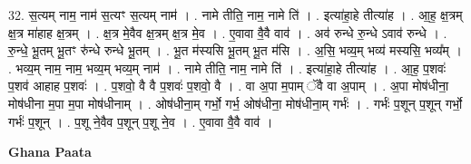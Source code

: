 \documentclass[17pt]{extarticle}
\begin{document}
32. स॒त्यम् नाम॒ नाम॑ स॒त्यꣳ स॒त्यम् नाम॑ । . नामे तीति॒ नाम॒ नामे ति॑ । . इत्या॑हा॒हे तीत्या॑ह । . आ॒ह॒ क्ष॒त्रम् क्ष॒त्र मा॑हाह क्ष॒त्रम् । . क्ष॒त्र मे॒वैव क्ष॒त्रम् क्ष॒त्र मे॒व । . ए॒वावा वै॒वै वाव॑ । . अव॑ रुन्धे रु॒न्धे ऽवाव॑ रुन्धे । . रु॒न्धे॒ भू॒तम् भू॒तꣳ रु॑न्धे रुन्धे भू॒तम् । . भू॒त म॑स्यसि भू॒तम् भू॒त म॑सि । . अ॒सि॒ भव्य॒म् भव्य॑ मस्यसि॒ भव्य᳚म् । . भव्य॒म् नाम॒ नाम॒ भव्य॒म् भव्य॒म् नाम॑ । . नामे तीति॒ नाम॒ नामे ति॑ । . इत्या॑हा॒हे तीत्या॑ह । . आ॒ह॒ प॒शवः॑ प॒शव॑ आहाह प॒शवः॑ । . प॒शवो॒ वै वै प॒शवः॑ प॒शवो॒ वै । . वा अ॒पा म॒पाम् ॅवै वा अ॒पाम् । . अ॒पा मोष॑धीना॒ मोष॑धीना म॒पा म॒पा मोष॑धीनाम् । . ओष॑धीना॒म् गर्भो॒ गर्भ॒ ओष॑धीना॒ मोष॑धीना॒म् गर्भः॑ । . गर्भः॑ प॒शून् प॒शून् गर्भो॒ गर्भः॑ प॒शून् । . प॒शू ने॒वैव प॒शून् प॒शू ने॒व । . ए॒वावा वै॒वै वाव॑ । \newline

\textbf{Ghana Paata } \newline
\end{document}
